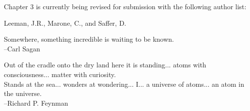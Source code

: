 \documentclass[11pt]{psuthesis}
\begin{document}
\begin{frontmatter}
\begin{singlespace}
\noindent
Chapter 3 is currently being revised for submission with the following author list:\\
\begin{adjustwidth}{2cm}{}
Leeman, J.R., Marone, C., and Saffer, D.
\end{adjustwidth}

\end{singlespace}
\clearpage

\vspace*{2.0truein}

\parbox{4.0truein}{
\par\noindent
Somewhere, something incredible is waiting to be known.\\
\hspace*{\fill}--Carl Sagan
}

\vspace{4pc}

\parbox{4.0truein}{
\par\noindent
Out of the cradle onto the dry land here it is standing... atoms with consciousness... matter with curiosity.\\
Stands at the sea... wonders at wondering... I... a universe of atoms... an atom in the universe.\\
\hspace*{\fill}--Richard P. Feynman
}
\end{frontmatter}









%

\appendices







\end{document}
